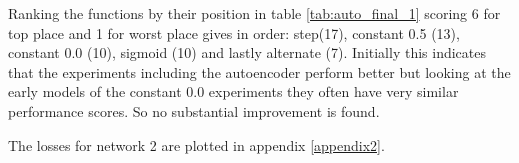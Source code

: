       Ranking the functions by their position in table \ref{tab:auto_final_1} scoring 6 for top place and 1 for worst place gives in order:
      step(17), constant 0.5 (13), constant 0.0 (10), sigmoid (10) and lastly alternate (7). Initially this indicates that the
      experiments including the autoencoder perform better but looking at the early models of the constant 0.0 experiments
      they often have very similar performance scores. So no substantial improvement is found.

      The losses for network 2 are plotted in appendix \ref{appendix2}.

